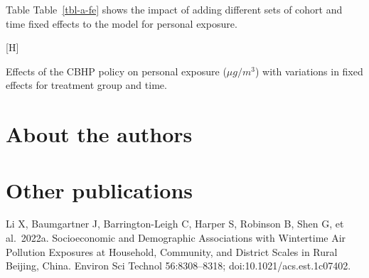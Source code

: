 \documentclass[
  letterpaper,
  DIV=11,
  numbers=noendperiod]{scrartcl}
\makeatletter
\renewenvironment{table}%
   {\renewcommand\familydefault\sfdefault
    \@float{table}}
   {\end@float}
\makeatother
\begin{document}
Table Table~\ref{tbl-a-fe} shows the impact of adding different sets of
cohort and time fixed effects to the model for personal exposure.

\begin{table}[H]

\caption{\label{tbl-a-fe}Effects of the CBHP policy on personal exposure
(\(\mu g / m^{3}\)) with variations in fixed effects for treatment group
and time.}


\end{table}%

\newpage

\section*{About the authors}\label{about-the-authors}

\section*{Other publications}\label{other-publications}

Li X, Baumgartner J, Barrington-Leigh C, Harper S, Robinson B, Shen G,
et al.~2022a. Socioeconomic and Demographic Associations with Wintertime
Air Pollution Exposures at Household, Community, and District Scales in
Rural Beijing, China. Environ Sci Technol 56:8308--8318;
doi:10.1021/acs.est.1c07402.
\end{document}
